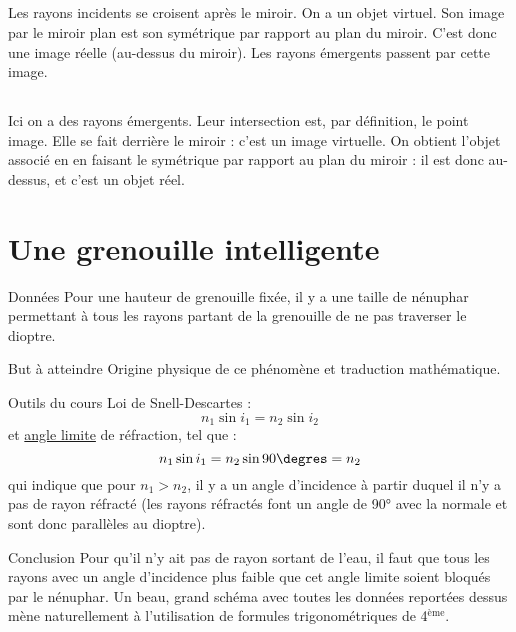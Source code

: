 \documentclass[10pt,a5paper,notitlepage]{book}
\begin{document}
\subsection{}
Les rayons incidents se croisent après le miroir. On a un objet virtuel. Son
image par le miroir plan est son symétrique par rapport au plan du miroir. C'est
donc une image réelle (au-dessus du miroir). Les rayons émergents passent par
cette image.

\subsection{}
Ici on a des rayons émergents. Leur intersection est, par définition, le point
image. Elle se fait derrière le miroir : c'est un image virtuelle. On obtient
l'objet associé en en faisant le symétrique par rapport au plan du miroir : il
est donc au-dessus, et c'est un objet réel.

\section{Une grenouille intelligente}
\begin{NCdefi}{Données}
    Pour une hauteur de grenouille fixée, il y a une taille de
    nénuphar permettant à tous les rayons partant de la grenouille de ne
    pas traverser le dioptre.
\end{NCdefi}

\begin{NCprop}{But à atteindre}
    Origine physique de ce phénomène et traduction mathématique.
\end{NCprop}

\begin{NCdemo}{Outils du cours}
    Loi de Snell-Descartes :
    \[ n_1\sin i_1 = n_2\sin i_2\]
    et \underline{angle limite} de réfraction, tel que :
    \[ n_1\sin i_1 = n_2\sin 90\degres = n_2\]
    qui indique que pour $n_1 > n_2$, il y a un angle d'incidence à
    partir duquel il n'y a pas de rayon réfracté (les rayons réfractés font un
    angle de 90° avec la normale et sont donc parallèles au dioptre).
\end{NCdemo}

\begin{NCexem}{Conclusion}
     Pour qu'il n'y ait pas de rayon sortant de l'eau, il faut que tous les
     rayons avec un angle d'incidence plus faible que cet angle limite soient
     bloqués par le nénuphar. Un beau, grand schéma avec toutes les données
     reportées dessus mène naturellement à l'utilisation de formules
     trigonométriques de 4$^\mathrm{ème}$.
\end{NCexem}
\end{document}
